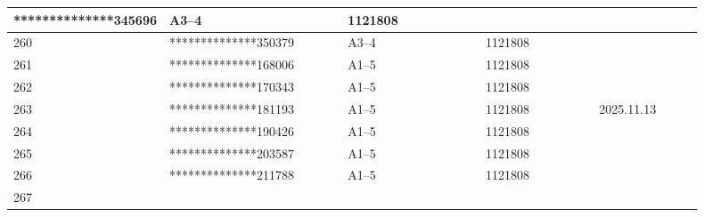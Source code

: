 \documentclass[UTF8,10pt,a4paper,fontset=fandol]{ctexart}
\newcommand{\fieldvalue}[1]{#1}
\newcommand{\handwritten}[1]{#1}
\begin{document}
\begin{center}
\begin{tabular}{|p{0.07\linewidth}|p{0.27\linewidth}|p{0.22\linewidth}|p{0.18\linewidth}|p{0.16\linewidth}|}
\fieldvalue{**************345696} &
\fieldvalue{A3--4} &
\fieldvalue{1121808} & \\ \hline
260 &
\fieldvalue{**************350379} &
\fieldvalue{A3--4} &
\fieldvalue{1121808} & \\ \hline
261 &
\fieldvalue{**************168006} &
\fieldvalue{A1--5} &
\fieldvalue{1121808} & \\ \hline
262 &
\fieldvalue{**************170343} &
\fieldvalue{A1--5} &
\fieldvalue{1121808} & \\ \hline
263 &
\fieldvalue{**************181193} &
\fieldvalue{A1--5} &
\fieldvalue{1121808} &
\fieldvalue{\handwritten{2025.11.13}}
\\ \hline
264 &
\fieldvalue{**************190426} &
\fieldvalue{A1--5} &
\fieldvalue{1121808} & \\ \hline
265 &
\fieldvalue{**************203587} &
\fieldvalue{A1--5} &
\fieldvalue{1121808} & \\ \hline
266 &
\fieldvalue{**************211788} &
\fieldvalue{A1--5} &
\fieldvalue{1121808} & \\ \hline
267 &

\end{tabular}
\end{center}
\end{document}
